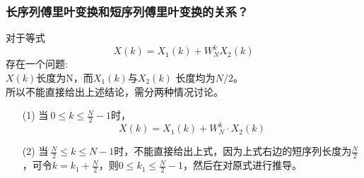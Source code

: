 \documentclass[notheorems,compress,mathserif,table]{beamer}
\begin{document}
\begin{frame}[shrink]\frametitle{长序列傅里叶变换和短序列傅里叶变换的关系？}
对于等式
\[ X(k) = X_1(k)  +   W_{N}^{k}X_2(k) \]
存在一个问题:\\
{\heiti $X(k)$长度为N，而$X_{1}(k)$与$X_{2}(k)$ 长度均为$N/2$。}\\
所以不能直接给出上述结论，需分两种情况讨论。

\begin{enumerate}
	\item [(1)] 当$\: 0\leq k\leq \frac{N}{2}-1$时，
	$$X(k)=X_{1}(k) + W_{N}^{k}\cdot X_{2}(k)$$
	\item [(2)]当$\: \frac{N}{2}\leq k\leq N-1$时，不能直接给出上式，因为上式右边的短序列长度为$ \frac{N}{2} $，可令$k=k_{1}+\frac{N}{2}$，则$0\leq k_{1}\leq \frac{N}{2}-1$，然后在对原式进行推导。
\end{enumerate}
\end{frame}
\end{document}
